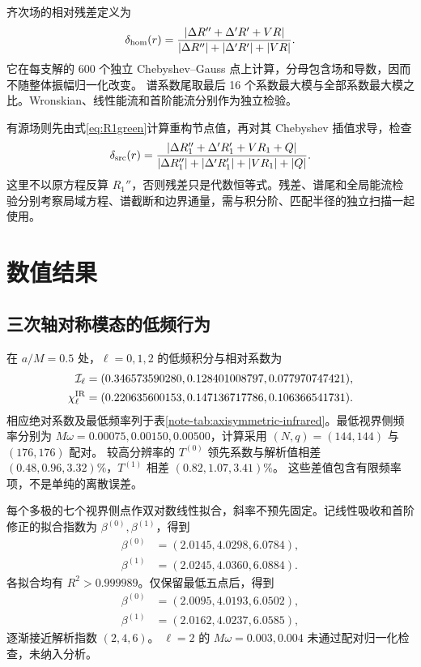 \documentclass[UTF8,fontset=fandol,11pt,a4paper]{ctexart}
\numberwithin{equation}{section}
\begin{document}
齐次场的相对残差定义为
\begin{equation}
\delta_{\rm hom}(r)=\frac{|\Delta R''+\Delta'R'+VR|}
{|\Delta R''|+|\Delta'R'|+|VR|}.\label{eq:residual}
\end{equation}
它在每支解的 600 个独立 Chebyshev--Gauss 点上计算，分母包含场和导数，因而不随整体振幅归一化改变。
谱系数尾取最后 16 个系数最大模与全部系数最大模之比。Wronskian、线性能流和首阶能流分别作为独立检验。

有源场则先由式\eqref{eq:R1green}计算重构节点值，再对其 Chebyshev 插值求导，检查
\begin{equation}
\delta_{\rm src}(r)=\frac{|\Delta R_1''+\Delta'R_1'+VR_1+Q|}
{|\Delta R_1''|+|\Delta'R_1'|+|VR_1|+|Q|}.\label{eq:sourceres}
\end{equation}
这里不以原方程反算 $R_1''$，否则残差只是代数恒等式。残差、谱尾和全局能流检验分别考察局域方程、谱截断和边界通量，需与积分阶、匹配半径的独立扫描一起使用。

\section{数值结果}
\label{sec:results}
\subsection{三次轴对称模态的低频行为}
在 $a/M=0.5$ 处，$\ell=0,1,2$ 的低频积分与相对系数为
\begin{align}
\mathcal I_\ell&=(0.346573590280,0.128401008797,0.077970747421),\\
\chi_\ell^{\rm IR}&=(0.220635600153,0.147136717786,0.106366541731).
\end{align}
相应绝对系数及最低频率列于表\ref{note-tab:axisymmetric-infrared}。最低视界侧频率分别为
$M\omega=0.00075,0.00150,0.00500$，计算采用 $(N,q)=(144,144)$ 与 $(176,176)$ 配对。
较高分辨率的 $T^{(0)}$ 领先系数与解析值相差 $(0.48,0.96,3.32)\%$，$T^{(1)}$ 相差 $(0.82,1.07,3.41)\%$。
这些差值包含有限频率项，不是单纯的离散误差。

每个多极的七个视界侧点作双对数线性拟合，斜率不预先固定。记线性吸收和首阶修正的拟合指数为 $\beta^{(0)},\beta^{(1)}$，得到
\begin{align}
\beta^{(0)}&=(2.0145,4.0298,6.0784),\\
\beta^{(1)}&=(2.0245,4.0360,6.0884).
\end{align}
各拟合均有 $R^2>0.999989$。仅保留最低五点后，得到
\begin{align}
\beta^{(0)}&=(2.0095,4.0193,6.0502),\\
\beta^{(1)}&=(2.0162,4.0237,6.0585),
\end{align}
逐渐接近解析指数 $(2,4,6)$。
$\ell=2$ 的 $M\omega=0.003,0.004$ 未通过配对归一化检查，未纳入分析。
\end{document}
